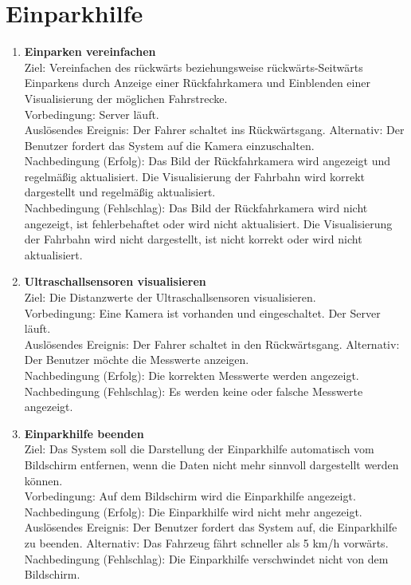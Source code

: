 \documentclass[pflichtenheft.tex]{subfiles}
\begin{document}
	\section{Einparkhilfe}
	
	\begin{enumerate}
	\setcounter{enumi}{\value{enumTemp}}

	\item{\textbf{Einparken vereinfachen}} \\ Ziel: Vereinfachen des rückwärts beziehungsweise rückwärts-Seitwärts Einparkens durch Anzeige einer Rückfahrkamera und Einblenden einer Visualisierung der möglichen Fahrstrecke. \\ Vorbedingung: Server läuft. \\ Auslösendes Ereignis:  Der Fahrer schaltet ins Rückwärtsgang. Alternativ: Der Benutzer fordert das System auf die Kamera einzuschalten. \\ Nachbedingung (Erfolg): Das Bild der Rückfahrkamera wird angezeigt und regelmäßig aktualisiert. Die Visualisierung der Fahrbahn wird korrekt dargestellt und regelmäßig aktualisiert. \\ Nachbedingung (Fehlschlag): Das Bild der Rückfahrkamera wird nicht angezeigt, ist fehlerbehaftet oder wird nicht aktualisiert. Die Visualisierung der Fahrbahn wird nicht dargestellt, ist nicht korrekt oder wird nicht aktualisiert. 

	\item{\textbf{Ultraschallsensoren visualisieren}} \\ Ziel: Die Distanzwerte der Ultraschallsensoren visualisieren. \\ Vorbedingung: Eine Kamera ist vorhanden und eingeschaltet. Der Server läuft. \\ Auslösendes Ereignis: Der Fahrer schaltet in den Rückwärtsgang. Alternativ: Der Benutzer möchte die Messwerte anzeigen.\\ Nachbedingung (Erfolg): Die korrekten Messwerte werden angezeigt. \\ Nachbedingung (Fehlschlag): Es werden keine oder falsche Messwerte angezeigt.

	\item{\textbf{Einparkhilfe beenden}} \\ Ziel: Das System soll die Darstellung der Einparkhilfe automatisch vom Bildschirm entfernen, wenn die Daten nicht mehr sinnvoll dargestellt werden können. \\ Vorbedingung: Auf dem Bildschirm wird die Einparkhilfe angezeigt. \\ Nachbedingung (Erfolg): Die Einparkhilfe wird nicht mehr angezeigt. \\ Auslösendes Ereignis: Der Benutzer fordert das System auf, die Einparkhilfe zu beenden. Alternativ: Das Fahrzeug fährt schneller als 5 km/h vorwärts. \\  Nachbedingung (Fehlschlag): Die Einparkhilfe verschwindet nicht von dem Bildschirm.

	\setcounter{enumTemp}{\value{enumi}}

	\end{enumerate}
	
\end{document}
